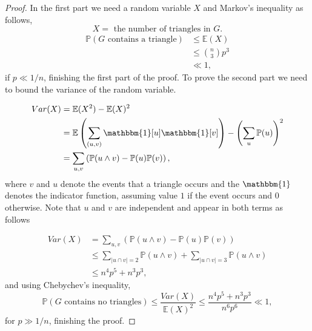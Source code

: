 \documentclass[12pt,twoside,a4paper,bibliography=totocnumbered]{book}
\numberwithin{equation}{section}
\theoremstyle{remark}
\begin{document}
\begin{proof}
In the first part we need a random variable $X$ and  Markov's inequality as follows,
$$ X = \text{ the number of triangles in } G.$$
\begin{align*}
\mathbb{P}(G\text{ contains a triangle}) &\leq \mathbb{E}(X)\\
& \leq \binom{n}{3}p^3 \\
& \ll 1,
\end{align*}
if $ p \ll 1/n$, finishing the first part of the proof. To prove the second part we need to bound the variance of the random variable.

\begin{align*}
Var(X) &= \mathbb{E}(X^2) - \mathbb{E}(X)^2\\
& = \mathbb{E} \left( \sum_{(u, v)} \mathbbm{1}[u]\mathbbm{1}[v] \right) - \left( \sum_u \mathbb{P}(u) \right) ^2\\
& = \sum_{u,v} \left(\mathbb{P}(u \wedge v) - \mathbb{P}(u)\mathbb{P}(v)\right),
\end{align*}
where $v$ and $u$ denote the events that a triangle occurs and the $\mathbbm{1}$ denotes the indicator function, assuming value $1$ if the event occurs and $0$ otherwise. Note that $u$ and $v$ are independent and appear in both terms as follows

\begin{align*}
Var(X) &= \sum_{u,v} \left(\mathbb{P}(u \wedge v) - \mathbb{P}(u)\mathbb{P}(v)\right)\\
& \leq \sum_{|u \cap v| = 2}\mathbb{P}(u \wedge v) + \sum_{|u \cap v| = 3}\mathbb{P}(u \wedge v)\\
&\leq n^4 p^5 + n^3 p^3,
\end{align*}
and using Chebychev's inequality,
$$\mathbb{P}(G \text{ contains no triangles}) \leq \frac{Var(X)}{\mathbb{E}(X)^2} \leq \frac{n^4p^5 + n^3p^3 }{n^6p^6} \ll 1,$$
for $p \gg 1/n$, finishing the proof.
 \end{proof}
\end{document}
